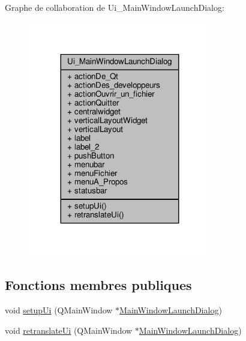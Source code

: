 Graphe de collaboration de Ui\+\_\+\+Main\+Window\+Launch\+Dialog\+:\nopagebreak
\begin{figure}[H]
\begin{center}
\leavevmode
\includegraphics[width=227pt]{classUi__MainWindowLaunchDialog__coll__graph}
\end{center}
\end{figure}
\subsection*{Fonctions membres publiques}
\begin{DoxyCompactItemize}
\item 
void \hyperlink{classUi__MainWindowLaunchDialog_aaf6508e53a3297d30c982c8f49b9ad61}{setup\+Ui} (Q\+Main\+Window $\ast$\hyperlink{classMainWindowLaunchDialog}{Main\+Window\+Launch\+Dialog})
\item 
void \hyperlink{classUi__MainWindowLaunchDialog_ab0d2fbf998b405c114cd669a247a10fa}{retranslate\+Ui} (Q\+Main\+Window $\ast$\hyperlink{classMainWindowLaunchDialog}{Main\+Window\+Launch\+Dialog})
\end{DoxyCompactItemize}
